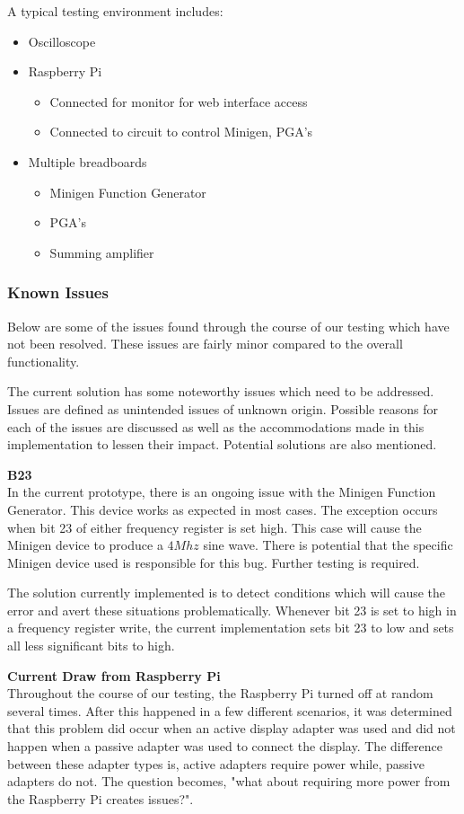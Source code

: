 \documentclass{article}	%
\begin{document}
\begin{multicols}{2}
A typical testing environment includes:
\begin{itemize}
\item Oscilloscope
\item Raspberry Pi
  \begin{itemize}
  \item Connected for monitor for web interface access
  \item Connected to circuit to control Minigen, PGA's
  \end{itemize}
\item Multiple breadboards
  \begin{itemize}
  \item Minigen Function Generator
  \item PGA's
  \item Summing amplifier
  \end{itemize}
\end{itemize}

\subsubsection{Known Issues}
Below are some of the issues found
through the course of our testing
which have not been resolved.
These issues are fairly minor compared
to the overall functionality.

The current solution has some noteworthy issues
which need to be addressed.
Issues are defined as unintended issues of unknown origin.
Possible reasons for each of the issues are discussed as
well as the accommodations made in this implementation to lessen their impact.
Potential solutions are also mentioned.

\textbf{B23}\\
In the current prototype,
there is an ongoing issue with the Minigen Function Generator.
This device works as expected in most cases.
The exception occurs when bit 23 of either frequency register
is set high.
This case will cause the Minigen device to produce a $4Mhz$ sine wave.
There is potential that the specific Minigen device used 
is responsible for this bug.
Further testing is required.

The solution currently implemented is
to detect conditions which will cause the error
and avert these situations problematically.
Whenever bit 23 is set to high in a frequency register write,
the current implementation sets bit 23 to low
and sets all less significant bits to high.

\textbf{Current Draw from Raspberry Pi}\\
Throughout the course of our testing,
the Raspberry Pi turned off at random several times.
After this happened in a few different scenarios,
it was determined that this problem
did occur when an active display adapter was used and
did not happen when a passive adapter was used 
to connect the display.
The difference between these adapter types is,
active adapters require power while,
passive adapters do not.
The question becomes,
"what about requiring more power from the Raspberry Pi creates issues?".


\end{multicols}
\end{document}
